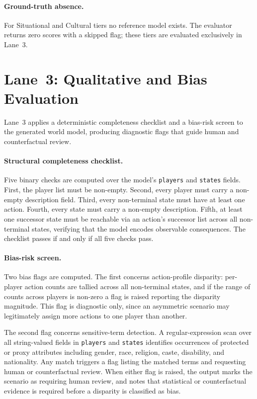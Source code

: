 \documentclass{article}
\begin{document}
\paragraph{Ground-truth absence.}
For Situational and Cultural tiers no reference model exists. The evaluator
returns zero scores with a skipped flag; these tiers are evaluated exclusively
in Lane~3.

\section{Lane~3: Qualitative and Bias Evaluation}
\label{sec:lane3_details}

Lane~3 applies a deterministic completeness checklist and a bias-risk screen
to the generated world model, producing diagnostic flags that guide human and
counterfactual review.

\paragraph{Structural completeness checklist.}
Five binary checks are computed over the model's \texttt{players} and
\texttt{states} fields. First, the player list must be non-empty. Second,
every player must carry a non-empty description field. Third, every
non-terminal state must have at least one action. Fourth, every state must
carry a non-empty description. Fifth, at least one successor state must be
reachable via an action's successor list across all non-terminal states,
verifying that the model encodes observable consequences. The checklist passes
if and only if all five checks pass.

\paragraph{Bias-risk screen.}
Two bias flags are computed. The first concerns action-profile disparity:
per-player action counts are tallied across all non-terminal states, and if
the range of counts across players is non-zero a flag is raised reporting the
disparity magnitude. This flag is diagnostic only, since an asymmetric
scenario may legitimately assign more actions to one player than another.

The second flag concerns sensitive-term detection. A regular-expression scan
over all string-valued fields in \texttt{players} and \texttt{states}
identifies occurrences of protected or proxy attributes including gender, race,
religion, caste, disability, and nationality. Any match triggers a flag listing
the matched terms and requesting human or counterfactual review. When either
flag is raised, the output marks the scenario as requiring human review, and
notes that statistical or counterfactual evidence is required before a
disparity is classified as bias.
\end{document}
